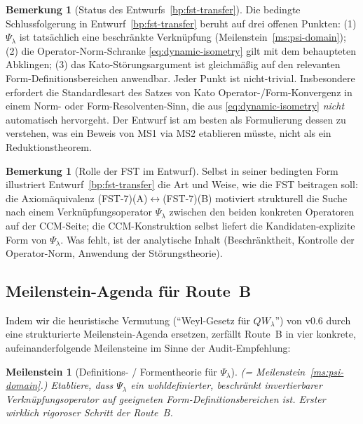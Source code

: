 \documentclass[11pt,a4paper]{article}
\theoremstyle{plain}
\newtheorem{milestone}[theorem]{Meilenstein}
\theoremstyle{definition}
\newtheorem{remark}[theorem]{Bemerkung}
\begin{document}
\begin{remark}[Status des Entwurfs~\ref{bp:fst-transfer}]
\label{rem:blueprint-caveats}
Die bedingte Schlussfolgerung in Entwurf~\ref{bp:fst-transfer} beruht
auf drei offenen Punkten: (1) $\Psi_\lambda$ ist tatsächlich eine beschränkte
Verknüpfung (Meilenstein~\ref{ms:psi-domain}); (2) die Operator-Norm-Schranke
\eqref{eq:dynamic-isometry} gilt mit dem behaupteten Abklingen; (3)
das Kato-Störungsargument ist gleichmäßig auf den relevanten Form-Definitionsbereichen
anwendbar. Jeder Punkt ist nicht-trivial. Insbesondere erfordert die
Standardlesart des Satzes von Kato Operator-/Form-Konvergenz in einem
Norm- oder Form-Resolventen-Sinn, die aus \eqref{eq:dynamic-isometry} \emph{nicht}
automatisch hervorgeht. Der Entwurf ist am besten als Formulierung dessen
zu verstehen, was ein Beweis von MS1 via MS2 etablieren müsste, nicht als
ein Reduktionstheorem.
\end{remark}

\begin{remark}[Rolle der FST im Entwurf]\label{rem:fst-contribution}
Selbst in seiner bedingten Form illustriert Entwurf~\ref{bp:fst-transfer}
die Art und Weise, wie die FST beitragen soll: die Axiomäquivalenz
(FST-7)(A)$\leftrightarrow$(FST-7)(B) motiviert strukturell die Suche nach
einem Verknüpfungsoperator $\Psi_\lambda$ zwischen den beiden konkreten
Operatoren auf der CCM-Seite; die CCM-Konstruktion selbst liefert
die Kandidaten-explizite Form von $\Psi_\lambda$. Was fehlt, ist der
analytische Inhalt (Beschränktheit, Kontrolle der Operator-Norm, Anwendung der
Störungstheorie).
\end{remark}

\subsection{Meilenstein-Agenda für Route~B}
\label{sec:route-b-milestones}

Indem wir die heuristische Vermutung (``Weyl-Gesetz für $QW_\lambda$'') von
v0.6 durch eine strukturierte Meilenstein-Agenda ersetzen, zerfällt Route~B
in vier konkrete, aufeinanderfolgende Meilensteine im Sinne der Audit-Empfehlung:

\begin{milestone}[Definitions- / Formentheorie für $\Psi_\lambda$]
\label{ms:1}
(= Meilenstein~\ref{ms:psi-domain}.) Etabliere, dass $\Psi_\lambda$ ein
wohldefinierter, beschränkt invertierbarer Verknüpfungsoperator auf geeigneten
Form-Definitionsbereichen ist. Erster wirklich rigoroser Schritt der Route~B.
\end{milestone}
\end{document}
